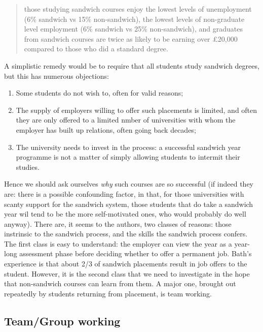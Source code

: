 \documentclass[sigconf]{acmart}
\begin{document}
\begin{quote} those studying sandwich courses enjoy the lowest levels
of unemployment (6\% sandwich vs 15\% non-sandwich), the lowest levels
of non-graduate level employment (6\% sandwich vs 25\% non-sandwich),
and graduates from sandwich courses are twice as likely to be earning
over \pounds20,000 compared to those who did a standard
degree. \cite[\P2.5]{Shadbolt2016a}
\end{quote}

A simplistic remedy would be to require that all students study
sandwich degrees, but this has numerous objections:

\begin{enumerate}
\item Some students do not wish to, often for valid reasons;
\item The supply of employers willing to offer such placements is
limited, and often they are only offered to a limited nmber of
universities with whom the employer has built up relations, often
going back decades;
\item The university needs to invest in the process: a successful
sandwich year programme is not a matter of simply allowing students to
intermit their studies.
\end{enumerate}

Hence we should ask ourselves \emph{why} such courses are so
successful (if indeed they are: there is a possible confounding
factor, in that, for those universities with scanty support for the
sandwich system, those students that do take a sandwich year wil tend
to be the more self-motivated ones, who would probably do well
anyway).  %
There are, it seems to the
authors, two classes of reasons: those instrinsic to the sandwich
process, and the skills the sandwich process confers. The first class
is easy to understand: the employer can view the year as a year-long
assessment phase before deciding whether to offer a permanent
job. Bath's experience is that about 2/3 of sandwich placements result
in job offers to the student. However, it is the second class that we
need to investigate in the hope that non-sandwich courses can learn from them. A major one, brought out repeatedly by students
returning from placement, is team working.

\subsection{Team/Group working}
\end{document}
